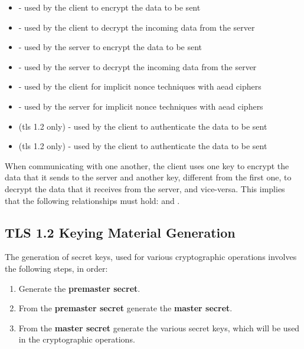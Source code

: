 \documentclass{llncs}
\begin{document}
{\begin{itemize}
  \item {} - used by the client to encrypt the data to be sent
  \item {} - used by the client to decrypt the incoming data from the server
  \item {} - used by the server to encrypt the data to be sent
  \item {} - used by the server to decrypt the incoming data from the server
  \item {} - used by the client for implicit nonce techniques with \gls{aead} ciphers
  \item {} - used by the server for implicit nonce techniques with \gls{aead} ciphers
  \item {} (\gls{tls} 1.2 only) - used by the client to authenticate the data to be sent
  \item {} (\gls{tls} 1.2 only) - used by the client to authenticate the data to be sent
\end{itemize}

When communicating with one another, the client uses one key to
encrypt the data that it sends to the server and another key, different from the first one, to decrypt the data
that it receives from the server, and vice-versa. This implies that the  following relationships must hold:
 and .

\subsection{TLS 1.2 Keying Material Generation} \label{keying-material}

The generation of secret keys, used for various cryptographic operations involves the
following steps, in order:

\begin{enumerate}
  \item Generate the \textbf{premaster secret}.
  \item From the \textbf{premaster secret} generate the \textbf{master secret}.
  \item From the \textbf{master secret} generate the various secret keys, which
  will be used in the cryptographic operations.
\end{enumerate}

}
\end{document}
